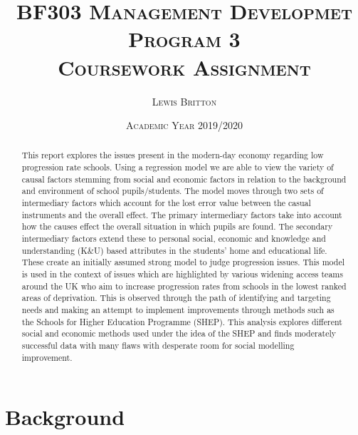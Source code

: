 \documentclass[11pt, english]{article}
\begin{document}

        \title{\textsc{BF303 Management Developmet Program 3\\ Coursework Assignment}}
        \author{\textsc{Lewis Britton}}
        \date{\textsc{Academic Year 2019/2020}}
        \maketitle
        
        \begin{abstract}
		This report explores the issues present in the modern-day economy regarding low progression rate schools. Using a regression model we are able to view the variety of causal factors stemming from social and economic factors in relation to the background and environment of school pupils/students. The model moves through two sets of intermediary factors which account for the lost error value between the casual instruments and the overall effect. The primary intermediary factors take into account how the causes effect the overall situation in which pupils are found. The secondary intermediary factors extend these to personal social, economic and knowledge and understanding (K\&U) based attributes in the students' home and educational life. These create an initially assumed strong model to judge progression issues. This model is used in the context of issues which are highlighted by various widening access teams around the UK who aim to increase progression rates from schools in the lowest ranked areas of deprivation. This is observed through the path of identifying and targeting needs and making an attempt to implement improvements through methods such as the Schools for Higher Education Programme (SHEP). This analysis explores different social and economic methods used under the idea of the SHEP and finds moderately successful data with many flaws with desperate room for social modelling improvement.
	\end{abstract}

\newpage


	\renewcommand{\contentsname}{Table of Contents}

        \tableofcontents

\newpage


\section{Background}
\end{document}
